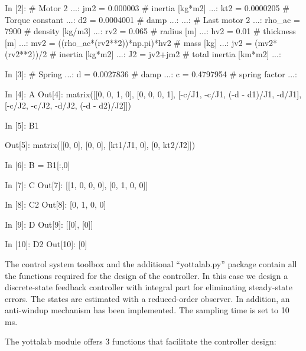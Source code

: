 \begin{code}
In [2]: # Motor 2
   ...: jm2 = 0.000003   # inertia [kg*m2]
   ...: kt2 = 0.0000205  # Torque constant
   ...: d2 = 0.0004001 # damp
   ...: 
   ...: # Last motor 2
   ...: rho_ac = 7900   # density [kg/m3]
   ...: rv2 = 0.065     # radius [m] 
   ...: hv2 = 0.01      # thickness [m]
   ...: mv2 = ((rho_ac*(rv2**2))*np.pi)*hv2   # mass [kg]
   ...: jv2 = (mv2*(rv2**2))/2              # inertia [kg*m2]
   ...: J2 = jv2+jm2                   # total inertia [km*m2]
   ...: 
\end{code}

\begin{code}
In [3]: # Spring         
   ...: d = 0.0027836   # damp
   ...: c = 0.4797954   # spring factor
   ...: 
\end{code}
 
\begin{code}

In [4]: A
Out[4]: 
matrix([[0, 0, 1, 0],
        [0, 0, 0, 1],
        [-c/J1, -c/J1, (-d - d1)/J1, -d/J1],
        [-c/J2, -c/J2, -d/J2, (-d - d2)/J2]])

In [5]: B1

Out[5]: 
matrix([[0, 0],
        [0, 0],
        [kt1/J1, 0],
        [0, kt2/J2]])

In [6]: B = B1[:,0]
        
In [7]: C
Out[7]: [[1, 0, 0, 0], [0, 1, 0, 0]]

In [8]: C2
Out[8]: [0, 1, 0, 0]

In [9]: D
Out[9]: [[0], [0]]

In [10]: D2
Out[10]: [0]
\end{code}

The control system toolbox and the additional ``yottalab.py'' package contain 
all the functions required for the design of the controller. In this case
we design a discrete-state feedback controller with integral part for 
eliminating steady-state errors. The states are estimated with a reduced-order 
observer.
In addition, an anti-windup mechanism has been implemented. The sampling time 
is set to 10 ms.

The yottalab module offers 3 functions that facilitate the controller 
design:

